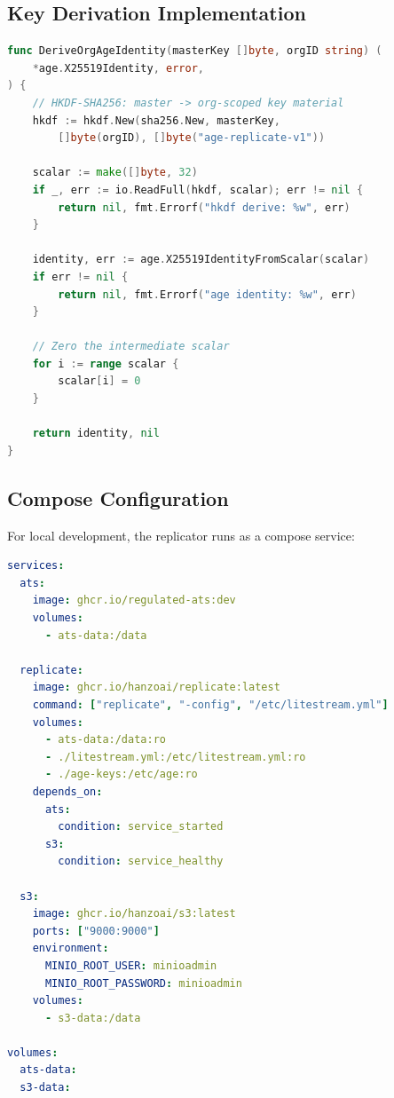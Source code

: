 \subsection{Key Derivation Implementation}

\begin{lstlisting}[language=Go,caption={Per-org age key derivation.}]
func DeriveOrgAgeIdentity(masterKey []byte, orgID string) (
    *age.X25519Identity, error,
) {
    // HKDF-SHA256: master -> org-scoped key material
    hkdf := hkdf.New(sha256.New, masterKey,
        []byte(orgID), []byte("age-replicate-v1"))

    scalar := make([]byte, 32)
    if _, err := io.ReadFull(hkdf, scalar); err != nil {
        return nil, fmt.Errorf("hkdf derive: %w", err)
    }

    identity, err := age.X25519IdentityFromScalar(scalar)
    if err != nil {
        return nil, fmt.Errorf("age identity: %w", err)
    }

    // Zero the intermediate scalar
    for i := range scalar {
        scalar[i] = 0
    }

    return identity, nil
}
\end{lstlisting}

\subsection{Compose Configuration}

For local development, the replicator runs as a compose service:

\begin{lstlisting}[language=YAML,caption={compose.yml excerpt for replicate sidecar.}]
services:
  ats:
    image: ghcr.io/regulated-ats:dev
    volumes:
      - ats-data:/data

  replicate:
    image: ghcr.io/hanzoai/replicate:latest
    command: ["replicate", "-config", "/etc/litestream.yml"]
    volumes:
      - ats-data:/data:ro
      - ./litestream.yml:/etc/litestream.yml:ro
      - ./age-keys:/etc/age:ro
    depends_on:
      ats:
        condition: service_started
      s3:
        condition: service_healthy

  s3:
    image: ghcr.io/hanzoai/s3:latest
    ports: ["9000:9000"]
    environment:
      MINIO_ROOT_USER: minioadmin
      MINIO_ROOT_PASSWORD: minioadmin
    volumes:
      - s3-data:/data

volumes:
  ats-data:
  s3-data:
\end{lstlisting}


